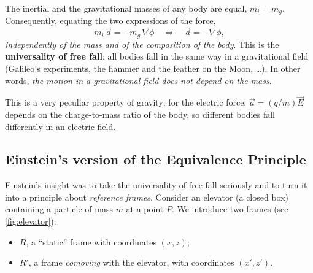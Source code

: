 \begin{keyresult}
The inertial and the gravitational masses of any body are equal, $m_i=m_g$. Consequently, equating the two expressions of the force,
\begin{equation}
  m_i\,\vec a = -m_g\,\nabla\phi \quad\Longrightarrow\quad \vec a = -\nabla\phi ,
\end{equation}
\emph{independently of the mass and of the composition of the body}. This is the \textbf{universality of free fall}: all bodies fall in the same way in a gravitational field (Galileo's experiments, the hammer and the feather on the Moon, \dots). In other words, \emph{the motion in a gravitational field does not depend on the mass}.
\end{keyresult}

This is a very peculiar property of gravity: for the electric force, $\vec a=(q/m)\vec E$ depends on the charge-to-mass ratio of the body, so different bodies fall differently in an electric field.

\subsection{Einstein's version of the Equivalence Principle}

Einstein's insight was to take the universality of free fall seriously and to turn it into a principle about \emph{reference frames}. Consider an elevator (a closed box) containing a particle of mass $m$ at a point $P$. We introduce two frames (see \cref{fig:elevator}):
\begin{itemize}[nosep]
  \item $R$, a ``static'' frame with coordinates $(x,z)$;
  \item $R'$, a frame \emph{comoving} with the elevator, with coordinates $(x',z')$.
\end{itemize}

